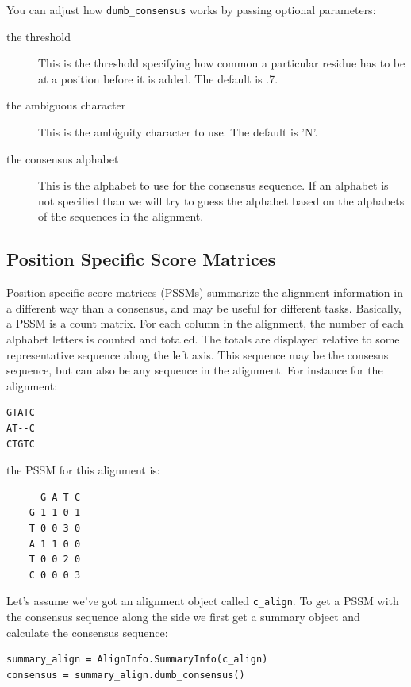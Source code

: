 \documentclass{report}
\begin{document}
You can adjust how \verb|dumb_consensus| works by passing optional parameters:

\begin{description}
\item[the threshold] This is the threshold specifying how common a particular residue has to be at a position before it is added. The default is .7.

\item[the ambiguous character] This is the ambiguity character to use. The default is 'N'.

\item[the consensus alphabet] This is the alphabet to use for the consensus sequence. If an alphabet is not specified than we will try to guess the alphabet based on the alphabets of the sequences in the alignment.
\end{description}

\subsection{Position Specific Score Matrices}
\label{sec:pssm}

Position specific score matrices (PSSMs) summarize the alignment information in a different way than a consensus, and may be useful for different tasks. Basically, a PSSM is a count matrix. For each column in the alignment, the number of each alphabet letters is counted and totaled. The totals are displayed relative to some representative sequence along the left axis. This sequence may be the consesus sequence, but can also be any sequence in the alignment. For instance for the alignment:

\begin{verbatim}
GTATC
AT--C
CTGTC
\end{verbatim}

the PSSM for this alignment is:

\begin{verbatim}
      G A T C
    G 1 1 0 1
    T 0 0 3 0
    A 1 1 0 0
    T 0 0 2 0
    C 0 0 0 3
\end{verbatim}

Let's assume we've got an alignment object called \verb|c_align|. To get a PSSM with the consensus sequence along the side we first get a summary object and calculate the consensus sequence:

\begin{verbatim}
summary_align = AlignInfo.SummaryInfo(c_align)
consensus = summary_align.dumb_consensus()
\end{verbatim}
\end{document}
